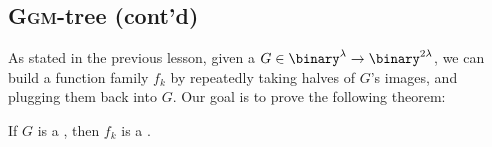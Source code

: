 
\subsection{\textsc{Ggm}-tree (cont'd)}

As stated in the previous lesson, given a \prg{} $G \in \binary^\lambda \to \binary^{2\lambda}$, we can build a function family $f_k$ by repeatedly taking halves of $G$'s images, and plugging them back into $G$. Our goal is to prove the following theorem:

\begin{theorem}
    If $G$ is a \prg, then $f_k$ is a \prf.
\end{theorem}

